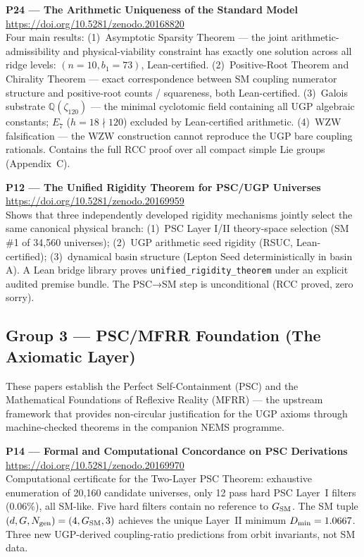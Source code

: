 \documentclass[11pt]{article}
\begin{document}
\medskip
\noindent\textbf{P24 — The Arithmetic Uniqueness of the Standard Model}~\cite{Spivack2026_Uniqueness25}\\
\url{https://doi.org/10.5281/zenodo.20168820}\\
Four main results: (1)~Asymptotic Sparsity Theorem — the joint arithmetic-
admissibility and physical-viability constraint has exactly one solution across
all ridge levels: $(n=10, b_1=73)$, Lean-certified. (2)~Positive-Root Theorem
and Chirality Theorem — exact correspondence between SM coupling numerator
structure and positive-root counts / squareness, both Lean-certified. (3)~Galois
substrate $\mathbb{Q}(\zeta_{120})$ — the minimal cyclotomic field containing
all UGP algebraic constants; $E_7$ ($h=18 \nmid 120$) excluded by
Lean-certified arithmetic. (4)~WZW falsification — the WZW construction
cannot reproduce the UGP bare coupling rationals.  Contains the full
RCC proof over all compact simple Lie groups (Appendix~C).

\medskip
\noindent\textbf{P12 — The Unified Rigidity Theorem for PSC/UGP Universes}~\cite{SpivackUnifiedRigidity}\\
\url{https://doi.org/10.5281/zenodo.20169959}\\
Shows that three independently developed rigidity mechanisms jointly select
the same canonical physical branch: (1)~PSC Layer I/II theory-space selection
(SM \#1 of 34,560 universes); (2)~UGP arithmetic seed rigidity (RSUC,
Lean-certified); (3)~dynamical basin structure (Lepton Seed deterministically
in basin A).  A Lean bridge library proves \texttt{unified\_rigidity\_theorem}
under an explicit audited premise bundle.  The PSC→SM step is unconditional
(RCC proved, zero sorry).

\subsection{Group 3 — PSC/MFRR Foundation (The Axiomatic Layer)}

These papers establish the Perfect Self-Containment (PSC) and the
Mathematical Foundations of Reflexive Reality (MFRR) --- the upstream framework
that provides non-circular justification for the UGP axioms through
machine-checked theorems in the companion NEMS programme.

\medskip
\noindent\textbf{P14 — Formal and Computational Concordance on PSC Derivations}~\cite{SpivackPSCConcordance}\\
\url{https://doi.org/10.5281/zenodo.20169970}\\
Computational certificate for the Two-Layer PSC Theorem: exhaustive enumeration
of 20,160 candidate universes, only 12 pass hard PSC Layer~I filters ($0.06\%$),
all SM-like.  Five hard filters contain no reference to $G_{\rm SM}$.  The SM
tuple $(d,G,N_{\rm gen}) = (4, G_{\rm SM}, 3)$ achieves the unique Layer~II
minimum $D_{\rm min} = 1.0667$.  Three new UGP-derived coupling-ratio
predictions from orbit invariants, not SM data.
\end{document}

